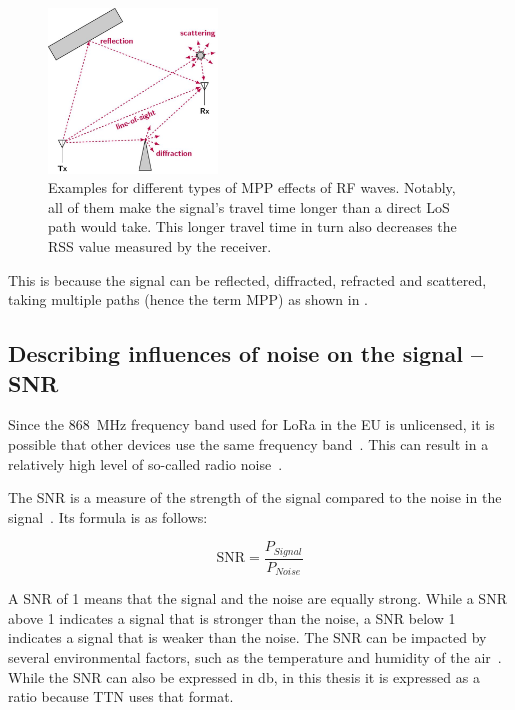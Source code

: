 \begin{figure}[htbp]
    \centering
    \includegraphics[width=0.4\textwidth]{pictures/diagrams_figures/multipath_propagation.jpg}
    \caption[Examples for different types of \acl{MPP} effects of \acl{RF} waves.]{
        Examples for different types of \acf{MPP} effects of \ac{RF} waves.
        Notably, all of them make the signal's travel time longer than a direct \ac{LoS} path would take.
        This longer travel time in turn also decreases the \ac{RSS} value measured by the receiver.~\protect\cite{milosevic_key_2017}
    }\label{pic:figure_multipath_propagation}
\end{figure}

This is because the signal can be reflected, diffracted, refracted and scattered, taking multiple paths (hence the term \acl{MPP}) as shown in .

\subsection{Describing influences of noise on the signal – \acf{SNR}}\label{sec:background-snr}

Since the \SI{868}{\mega\hertz} frequency band used for \ac{LoRa} in the \ac{EU} is unlicensed, it is possible that other devices use the same frequency band~\cite{etsi_etsi_2012}.
This can result in a relatively high level of so-called radio noise~\cite[p. 6]{fujdiak_insights_2022}.

The \acf{SNR} is a measure of the strength of the signal compared to the noise in the signal~\cite{johnson_signal--noise_2006}.
Its formula is as follows:

\begin{equation}
    \text{SNR} = \frac{P_{Signal}}{P_{Noise}}
\end{equation}

A \ac{SNR} of 1 means that the signal and the noise are equally strong.
While a \ac{SNR} above 1 indicates a signal that is stronger than the noise, a \ac{SNR} below 1 indicates a signal that is weaker than the noise.
The \ac{SNR} can be impacted by several environmental factors, such as the temperature and humidity of the air~\cite{jeftenic_impact_2020}.
While the \ac{SNR} can also be expressed in \si{\decibel}, in this thesis it is expressed as a ratio because \ac{TTN} uses that format.

